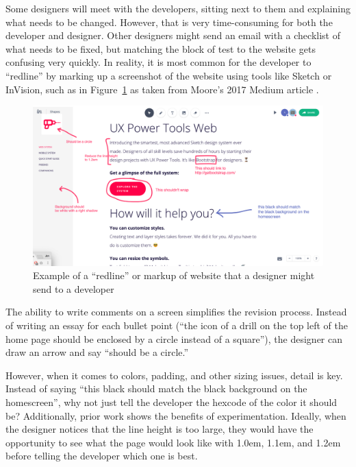 \documentclass{sigchi}
\begin{document}
Some designers will meet with the developers, sitting next to them and explaining what needs to be changed. However, that is very time-consuming for both the developer and designer. Other designers might send an email with a checklist of what needs to be fixed, but matching the block of test to the website gets confusing very quickly. In reality, it is most common for the developer to ``redline'' by marking up a screenshot of the website using tools like Sketch or InVision, such as in Figure~\ref{fig:markup_redline_website} as taken from Moore's 2017 Medium article \cite{digital_whiteboards_moore_medium_2017}. 

\begin{figure}
    \centering
    \includegraphics[width=\columnwidth]{figures/screenshot_redline_found_google.png}
    \caption{Example of a ``redline'' or markup of website that a designer might send to a developer}
    \label{fig:markup_redline_website}
\end{figure}

The ability to write comments on a screen simplifies the revision process. Instead of writing an essay for each bullet point (``the icon of a drill on the top left of the home page should be enclosed by a circle instead of a square''), the designer can draw an arrow and say ``should be a circle.'' 

However, when it comes to colors, padding, and other sizing issues, detail is key. Instead of saying ``this black should match the black background on the homescreen'', why not just tell the developer the hexcode of the color it should be? Additionally, prior work shows the benefits of experimentation. Ideally, when the designer notices that the line height is too large, they would have the opportunity to see what the page would look like with 1.0em, 1.1em, and 1.2em before telling the developer which one is best. 
\end{document}
